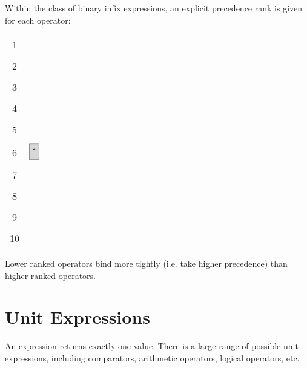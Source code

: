 Within the class of binary infix expressions, an explicit precedence rank is given for each operator:

\begin{syntax}
\begin{tabular}{cl}
1 & \token{*} \token{/}\\
&\\
2 & \token{+} \token{-}\\
&\\
3 & \token{==} \token{!=} \token{<} \token{<=} \token{>=} \token{>}\\
&\\
4 & \token{\&}\\
&\\
5 & \token{|}\\
&\\
6 & $\token{\^}$\\
&\\
7 & \token{\&\&}\\
&\\
8 & \token{||}\\
&\\
9 & \token{==>}\\
&\\
10 & \token{<==>}\\
\end{tabular}
\end{syntax}

Lower ranked operators bind more tightly (i.e. take higher precedence) than higher ranked operators.


\section{Unit Expressions}
\label{c_expr_unit}

An expression returns exactly one value.  There is a large range of possible unit expressions, including comparators, arithmetic operators, logical operators, etc.

